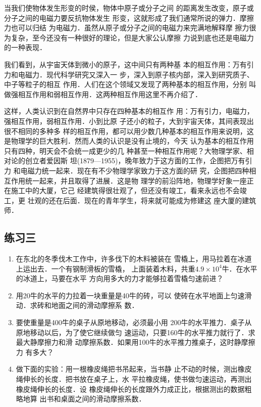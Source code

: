     当我们使物体发生形变的时侯，物体中原子或分子之间
的距离发生改变，原子或分子之间的电磁力要反抗物体发生
形变，这就形成了我们通常所说的弹力．摩擦力也可以归结
为电磁力．虽然从原子或分子之间的电磁力来完满地解释摩
擦力很为复杂，至今还没有一种很好的理论，但是大家公认摩擦
力说到底也还是电磁力的一种表现．

    我们看到，从宇宙天体到微小的原子，这中间只有两种基
本的相互作用：万有引力和电磁力．现代科学研究又深入一
步，深入到原子核内部，深入到研究质子、中子等粒子的相互
作用．人们在这个领域又发现了两种基本的相互作用，分别
叫做强相互作用和弱相互作用．这两种相互作用这里不再介绍了．

    这样，人类认识到在自然界中只存在四种基本的相互作
用：万有引力，电磁力，强相互作用，弱相互作用．小到比原
子还小的粒子，大到宇宙天体，其间表现出很不相同的多种多
样的相互作用，都可以用少数几种基本的相互作用来说明，这
是物理学的巨大胜利．然而人类的认识是没有止境的，今天
认为基本的相互作用只有四种，明天会不会统一成更少的几
种甚至一种相互作用呢？大物理学家、相对论的创立者爱因斯
坦(1879—1955)，晚年致力于这方面的工作，企图把万有引力
和电磁力统一起来．现在有不少物理学家致力于这方面的研
究，企图把四种相互作用统一起来，并且取得了进展．这是物
理学的前沿阵地，物理学好象一座正在施工中的大厦，它己
经建筑得很壮观了，但还没有竣工，看来永远也不会竣工，更
壮观的还在后面．现在的青年学生，将来就可能成为修建这
座大厦的建筑师．

\subsection*{练习三} 
\begin{enumerate} 
\item  在东北的冬季伐木工作中，许多伐下的木料被装在
雪橇上，用马拉着在冰道上运出去．一个有钢制滑板的雪橇，
上面装着木料，共重$4.9\times 10^4$牛．在水平的冰道上，马要在水平
方向用多大的力才能够拉着雪橇匀速前进？

\item  用20牛的水平的力拉着一块重量是40牛的砖，可以
使砖在水平地面上匀速滑动．求砖和地面之间的滑动摩擦系
数．
\item  要使重量是400牛的桌子从原地移动，必须最小用
200牛的水平推力．桌子从原地移动以后，为了使它继续做匀
速运动，只要160牛的水平推力就行了．求最大静摩擦力和滑
动摩擦系数．如果用100牛的水平推力推桌子，这时静摩擦力
有多大？

\item  做下面的实验：用一根橡皮绳把书吊起来，当书静
止不动的时候，测出橡皮绳伸长的长度．把书放在桌子上，水
平拉橡皮绳，使书做匀速运动，再测出橡皮绳伸长的长度．设
橡皮绳伸长的长度跟外力成正比，根据测出的数据粗略地算
出书和桌面之间的滑动摩擦系数．
\end{enumerate} 


